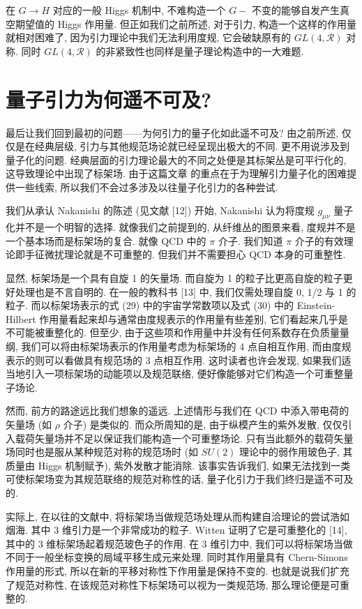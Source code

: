 \documentclass{article}
\begin{document}
在 $G\rightarrow H$ 对应的一般 Higgs 机制中, 不难构造一个 $G-$ 不变的能够自发产生真空期望值的 Higgs 作用量. 但正如我们之前所述, 对于引力, 构造一个这样的作用量就相对困难了, 因为引力理论中我们无法利用度规, 它会破缺原有的  $GL(4, \mathcal{R})$ 对称. 同时  $GL(4, \mathcal{R})$ 的非紧致性也同样是量子理论构造中的一大难题.
\section{量子引力为何遥不可及?}
最后让我们回到最初的问题——为何引力的量子化如此遥不可及? 由之前所述, 仅仅是在经典层级, 引力与其他规范场论就已经呈现出极大的不同. 更不用说涉及到量子化的问题. 经典层面的引力理论最大的不同之处便是其标架丛是可平行化的, 这导致理论中出现了标架场. 由于这篇文章 的重点在于为理解引力量子化的困难提供一些线索, 所以我们不会过多涉及以往量子化引力的各种尝试.

我们从承认 Nakanishi 的陈述 (见文献 [12]) 开始, Nakanishi 认为将度规 $g_{\mu\nu}$ 量子化并不是一个明智的选择. 就像我们之前提到的, 从纤维丛的图景来看, 度规并不是一个基本场而是标架场的复合. 就像 QCD 中的 $\pi$ 介子. 我们知道 $\pi$ 介子的有效理论即手征微扰理论就是不可重整的. 但我们并不需要担心 QCD 本身的可重整性.

显然, 标架场是一个具有自旋 1 的矢量场. 而自旋为 1 的粒子比更高自旋的粒子更好处理也是不言自明的. 在一般的教科书 [13] 中, 我们仅需处理自旋 0, 1/2 与 1 的粒子. 而以标架场表示的式 (29) 中的宇宙学常数项以及式 (30) 中的 Einstein-Hilbert 作用量看起来却与通常由度规表示的作用量有些差别, 它们看起来几乎是不可能被重整化的. 但至少, 由于这些项和作用量中并没有任何系数存在负质量量纲, 我们可以将由标架场表示的作用量考虑为标架场的 4 点自相互作用, 而由度规表示的则可以看做具有规范场的 3 点相互作用. 这时读者也许会发现, 如果我们适当地引入一项标架场的动能项以及规范联络, 便好像能够对它们构造一个可重整量子场论.

然而, 前方的路途远比我们想象的遥远. 上述情形与我们在 QCD 中添入带电荷的矢量场 (如 $\rho$ 介子) 是类似的. 而众所周知的是, 由于纵模产生的紫外发散, 仅仅引入载荷矢量场并不足以保证我们能构造一个可重整场论. 只有当此额外的载荷矢量场同时也是服从某种规范对称的规范场时 (如 $SU(2)$ 理论中的弱作用玻色子, 其质量由 Higgs 机制赋予), 紫外发散才能消除. 该事实告诉我们, 如果无法找到一类可使标架场变为其规范联络的规范对称性的话, 量子化引力于我们终归是遥不可及的.

实际上, 在以往的文献中, 将标架场当做规范场处理从而构建自洽理论的尝试浩如烟海. 其中 3 维引力是一个非常成功的粒子. Witten 证明了它是可重整化的 [14], 其中的 3 维标架场起着规范玻色子的作用. 在 3 维引力中, 我们可以将标架场当做不同于一般坐标变换的局域平移生成元来处理. 同时其作用量具有 Chern-Simons 作用量的形式, 所以在新的平移对称性下作用量是保持不变的. 也就是说我们扩充了规范对称性, 在该规范对称性下标架场可以视为一类规范场, 那么理论便是可重整的.
\end{document}
